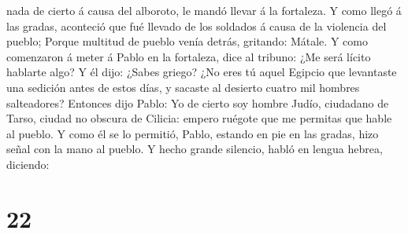 nada de cierto á causa del alboroto, le mandó llevar á la fortaleza.
 Y como llegó á las gradas, aconteció que fué llevado de
los soldados á causa de la violencia del pueblo;  Porque
multitud de pueblo venía detrás, gritando: Mátale.  Y
como comenzaron á meter á Pablo en la fortaleza, dice al tribuno: ¿Me
será lícito hablarte algo? Y él dijo: ¿Sabes griego?  ¿No
eres tú aquel Egipcio que levantaste una sedición antes de estos días, y
sacaste al desierto cuatro mil hombres salteadores? 
Entonces dijo Pablo: Yo de cierto soy hombre Judío, ciudadano de Tarso,
ciudad no obscura de Cilicia: empero ruégote que me permitas que hable
al pueblo.  Y como él se lo permitió, Pablo, estando en
pie en las gradas, hizo señal con la mano al pueblo. Y hecho grande
silencio, habló en lengua hebrea, diciendo:

\hypertarget{section-21}{%
\section{22}\label{section-21}}

